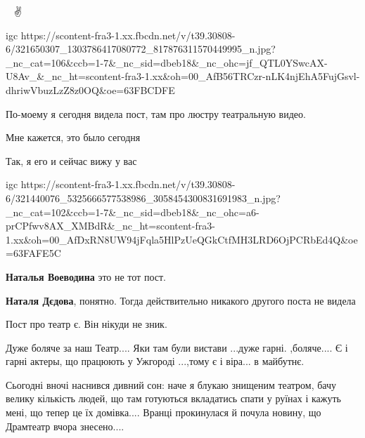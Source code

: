  
 
 
 
 


💖🙌🙏✌

\ifcmt
  igc https://scontent-fra3-1.xx.fbcdn.net/v/t39.30808-6/321650307_1303786417080772_817876311570449995_n.jpg?_nc_cat=106&ccb=1-7&_nc_sid=dbeb18&_nc_ohc=jf_QTL0YSwcAX-U8Av_&_nc_ht=scontent-fra3-1.xx&oh=00_AfB56TRCzr-nLK4njEhA5FujGsvl-dhriwVbuzLzZ8z0OQ&oe=63FBCDFE
\fi


По-моему я сегодня видела пост, там про люстру театральную видео.

Мне кажется, это было сегодня


Так, я его и сейчас вижу у вас

\ifcmt
  igc https://scontent-fra3-1.xx.fbcdn.net/v/t39.30808-6/321440076_5325666577538986_3058454300831691983_n.jpg?_nc_cat=102&ccb=1-7&_nc_sid=dbeb18&_nc_ohc=a6-prCPfwv8AX_XMBdR&_nc_ht=scontent-fra3-1.xx&oh=00_AfDxRN8UW94jFqla5HlPzUeQGkCtfMH3LRD6OjPCRbEd4Q&oe=63FAFE5C
\fi

\begin{itemize} %
\textbf{Наталья Воеводина} это не тот пост.

\textbf{Наталя Дєдова}, понятно. Тогда действительно никакого другого поста не видела
\end{itemize} %

Пост про театр є. Він нікуди не зник.


Дуже боляче за наш Театр.... Яки там були вистави ...дуже гарні. ,боляче.... Є і
гарні актеры, що працюють у Ужгороді ...,тому є і віра... в майбутнє.


Сьогодні вночі наснився дивний сон: наче я блукаю знищеним театром, бачу велику
кількість людей, що там готуються вкладатись спати у руїнах і кажуть мені, що
тепер це їх домівка.... Вранці прокинулася й почула новину, що Драмтеатр вчора
знесено....

